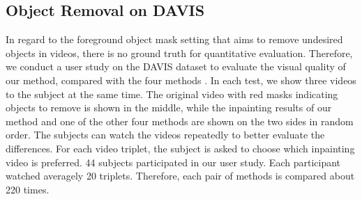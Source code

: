 \subsection{Object Removal on DAVIS}


In regard to the foreground object mask setting that aims to remove undesired objects in videos, there is no ground truth for quantitative evaluation. 
Therefore, we conduct a user study on the DAVIS dataset to evaluate the visual quality of our method, compared with the four methods \cite{nazeri2019edgeconnect,wang2019video,Kim_2019_CVPR1,Xu_2019_CVPR}.
%
In each test, we show three videos to the subject at the same time. The original video with red masks indicating objects to remove is shown in the middle, while the inpainting results of our method and one of the other four methods are shown on the two sides in random order.
%  
The subjects can watch the videos repeatedly to better evaluate the differences.
For each video triplet, the subject is asked to choose which inpainting video is preferred.
44 subjects participated in our user study. 
Each participant watched averagely 20 triplets. 
Therefore, each pair of methods is compared about 220 times.

%


\begin{table}[!t]
	\caption{Ablation studies on YouTubeVOS. Structure inference, structure attention model, and flow constrained loss are demonstrated effective in video inpainting.}\smallskip
	
	\centering
	\label{tab:abl}
\end{table}

